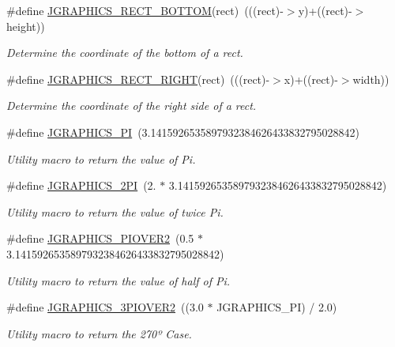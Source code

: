 \begin{DoxyCompactItemize}
\item 
\hypertarget{group__jgraphics_gaa3cb88e5a2a6b52ea668a1ed1bba4422}{
\#define \hyperlink{group__jgraphics_gaa3cb88e5a2a6b52ea668a1ed1bba4422}{JGRAPHICS\_\-RECT\_\-BOTTOM}(rect)~(((rect)-\/$>$y)+((rect)-\/$>$height))}
\label{group__jgraphics_gaa3cb88e5a2a6b52ea668a1ed1bba4422}

\begin{DoxyCompactList}\small\item\em Determine the coordinate of the bottom of a rect. \item\end{DoxyCompactList}\item 
\hypertarget{group__jgraphics_ga2e728ace124972d27dc4f7ae70c3e751}{
\#define \hyperlink{group__jgraphics_ga2e728ace124972d27dc4f7ae70c3e751}{JGRAPHICS\_\-RECT\_\-RIGHT}(rect)~(((rect)-\/$>$x)+((rect)-\/$>$width))}
\label{group__jgraphics_ga2e728ace124972d27dc4f7ae70c3e751}

\begin{DoxyCompactList}\small\item\em Determine the coordinate of the right side of a rect. \item\end{DoxyCompactList}\item 
\#define \hyperlink{group__jgraphics_gab6eb126ec0f85fa48c30aff48a3e0f5b}{JGRAPHICS\_\-PI}~(3.1415926535897932384626433832795028842)
\begin{DoxyCompactList}\small\item\em Utility macro to return the value of Pi. \item\end{DoxyCompactList}\item 
\#define \hyperlink{group__jgraphics_gafe32bbcad508a9ef7629a2c47719dcb5}{JGRAPHICS\_\-2PI}~(2. $\ast$ 3.1415926535897932384626433832795028842)
\begin{DoxyCompactList}\small\item\em Utility macro to return the value of twice Pi. \item\end{DoxyCompactList}\item 
\#define \hyperlink{group__jgraphics_gad1ac187e1ba64c0b956d6fff6a3da8dc}{JGRAPHICS\_\-PIOVER2}~(0.5 $\ast$ 3.1415926535897932384626433832795028842)
\begin{DoxyCompactList}\small\item\em Utility macro to return the value of half of Pi. \item\end{DoxyCompactList}\item 
\#define \hyperlink{group__jgraphics_gae9f23705d238432d1abb58a2ab0ac792}{JGRAPHICS\_\-3PIOVER2}~((3.0 $\ast$ JGRAPHICS\_\-PI) / 2.0)
\begin{DoxyCompactList}\small\item\em Utility macro to return the 270º Case. \item\end{DoxyCompactList}\end{DoxyCompactItemize}
